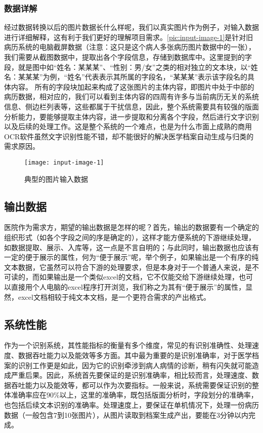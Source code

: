 \subsubsection*{数据详解}
经过数据转换以后的图片数据长什么样呢，我们以真实图片作为例子，对输入数据进行详细解释，这有利于我们更好的理解项目需求。\autoref{pic:input-image-1}是针对旧病历系统的电脑截屏数据（注意：这只是这个病人多张病历图片数据中的一张），我们需要从截图数据中，提取出各个字段信息，存储到数据库中。这里提到的字段，就是图中如“姓名：某某某”、“性别：男/女”之类的相对独立的文本块，以“姓名：某某某”为例，“姓名”代表表示其所属的字段名，“某某某”表示该字段名的具体内容。
所有的字段块加起来构成了这张图片的主体内容，即图片中处于中部的病历数据，相对应的，我们可以看到主体内容的四周有许多与当前病历无关的系统信息、侧边栏列表等，这些都属于干扰信息，因此，整个系统需要具有较强的版面分析能力，要能够提取主体内容，进一步提取和分离各个字段，然后进行文字识别以及后续的处理工作。这是整个系统的一个难点，也是为什么市面上成熟的商用OCR软件虽然文字识别性能不错，却不能很好的解决医学档案自动生成与归类的需求原因。
\begin{figure}[htbp]
	\centering
	\caption{典型的图片输入数据}
	\texttt{[image: input-image-1]}
	\label{pic:input-image-1}
\end{figure}

\subsection{输出数据}
\label{ssub:requirements-dataWriter}
医院作为需求方，期望的输出数据是怎样的呢？首先，输出的数据要有一个确定的组织形式（如各个字段之间的序是确定的），这样才能方便系统的下游继续处理，如数据提取、展示、入库等，这一点是不言自明的；与此同时，输出数据也应该有一定的便于展示的属性，何为“便于展示”呢，举个例子，如果输出是一个有序的纯文本数据，它虽然可以符合下游的处理要求，但是本身对于一个普通人来说，是不可读的，而如果输出是一个类似excel的文档，它不仅能交给下游继续处理，也可以直接用个人电脑的excel程序打开浏览，我们称之为其有“便于展示”的属性，显然，excel文档相较于纯文本文档，是一个更符合需求的产出格式。

\subsection{系统性能}
作为一个识别系统，其性能指标的衡量有多个维度，常见的有识别准确性、处理速度、数据吞吐能力以及能效等多方面。其中最为重要的是识别准确率，对于医学档案的识别工作更是如此，因为它的识别牵涉到病人病情的诊断，稍有闪失就可能造成严重后果。因此，系统首先要保证的是识别准确率，相比较而言，处理速度、数据吞吐能力以及能效等，都可以作为次要指标。一般来说，系统需要保证识别的整体准确率应在90\%以上，这里的准确率，既包括版面分析时，字段划分的准确率，也包括后续文本识别的准确率。处理速度上，要保证在单机情况下，处理一份病历数据（一般包含7到10张图片），从图片读取到档案生成产出，要能在3分钟以内完成。

